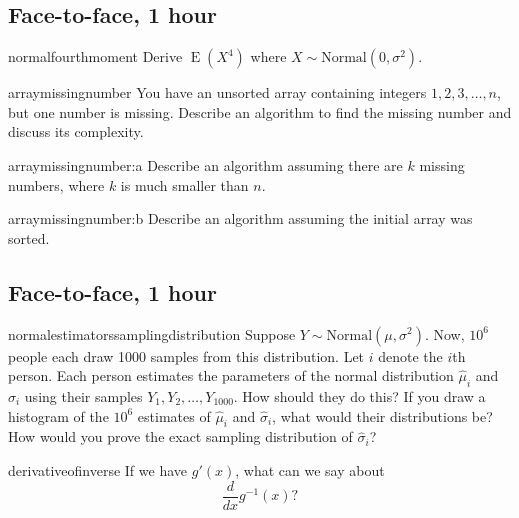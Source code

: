 \documentclass[a4paper]{article}
\begin{document}
\clearpage
\subsection{Face-to-face, 1 hour}
\begin{question}{normalfourthmoment}
Derive $\operatorname{E}(X^4)$ where $X \sim \text{Normal}\left(0, \sigma^2\right)$.
\end{question}


\begin{question}{arraymissingnumber}
You have an unsorted array containing integers $1,2,3, \ldots, n$, but one number is missing.
Describe an algorithm to find the missing number and discuss its complexity.
\end{question}


\begin{subquestion}{arraymissingnumber:a}
Describe an algorithm assuming there are $k$ missing numbers, where $k$ is much smaller than $n$.
\end{subquestion}


\begin{subquestion}{arraymissingnumber:b}
Describe an algorithm assuming the initial array was sorted.
\end{subquestion}


\clearpage






\clearpage
\subsection{Face-to-face, 1 hour}
\begin{question}{normalestimatorssamplingdistribution}
Suppose
$Y \sim \text{Normal}(\mu, \sigma^2)$.
Now, $10^6$ people each draw 1000 samples from this distribution.
Let $i$ denote the $i$th person.
Each person estimates the parameters of the normal distribution
$\hat{\mu}_i$
and
$\hat{\sigma}_i$
using their samples
$Y_1, Y_2, \ldots , Y_{1000}$.
How should they do this?
If you draw a histogram of the $10^6$ estimates of
$\hat{\mu}_i$ and $\hat{\sigma}_i$, what would their distributions be?
How would you prove the exact sampling distribution of $\hat{\sigma}_i$?
\end{question}


\begin{question}{derivativeofinverse}
If we have  $g'(x)$,
what can we say about
\[
\frac{d}{dx} g^{-1}(x)
\text{?}
\]

\end{question}
\end{document}
